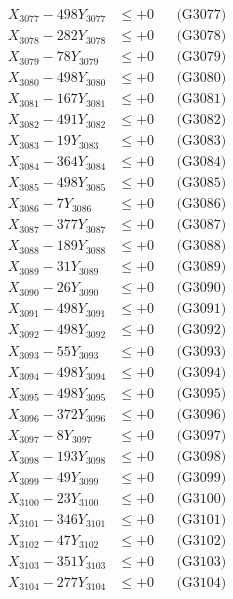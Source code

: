 \documentclass[a4paper,10pt]{article}
\begin{document}
{\begin{align}
X_{3077} - 498Y_{3077} &\leq +0 && \text{(G3077)} \\
X_{3078} - 282Y_{3078} &\leq +0 && \text{(G3078)} \\
X_{3079} - 78Y_{3079} &\leq +0 && \text{(G3079)} \\
X_{3080} - 498Y_{3080} &\leq +0 && \text{(G3080)} \\
\allowbreak
X_{3081} - 167Y_{3081} &\leq +0 && \text{(G3081)} \\
X_{3082} - 491Y_{3082} &\leq +0 && \text{(G3082)} \\
X_{3083} - 19Y_{3083} &\leq +0 && \text{(G3083)} \\
X_{3084} - 364Y_{3084} &\leq +0 && \text{(G3084)} \\
X_{3085} - 498Y_{3085} &\leq +0 && \text{(G3085)} \\
X_{3086} - 7Y_{3086} &\leq +0 && \text{(G3086)} \\
X_{3087} - 377Y_{3087} &\leq +0 && \text{(G3087)} \\
X_{3088} - 189Y_{3088} &\leq +0 && \text{(G3088)} \\
X_{3089} - 31Y_{3089} &\leq +0 && \text{(G3089)} \\
X_{3090} - 26Y_{3090} &\leq +0 && \text{(G3090)} \\
\allowbreak
X_{3091} - 498Y_{3091} &\leq +0 && \text{(G3091)} \\
X_{3092} - 498Y_{3092} &\leq +0 && \text{(G3092)} \\
X_{3093} - 55Y_{3093} &\leq +0 && \text{(G3093)} \\
X_{3094} - 498Y_{3094} &\leq +0 && \text{(G3094)} \\
X_{3095} - 498Y_{3095} &\leq +0 && \text{(G3095)} \\
X_{3096} - 372Y_{3096} &\leq +0 && \text{(G3096)} \\
X_{3097} - 8Y_{3097} &\leq +0 && \text{(G3097)} \\
X_{3098} - 193Y_{3098} &\leq +0 && \text{(G3098)} \\
X_{3099} - 49Y_{3099} &\leq +0 && \text{(G3099)} \\
X_{3100} - 23Y_{3100} &\leq +0 && \text{(G3100)} \\
\allowbreak
X_{3101} - 346Y_{3101} &\leq +0 && \text{(G3101)} \\
X_{3102} - 47Y_{3102} &\leq +0 && \text{(G3102)} \\
X_{3103} - 351Y_{3103} &\leq +0 && \text{(G3103)} \\
X_{3104} - 277Y_{3104} &\leq +0 && \text{(G3104)} \\

\end{align}}
\end{document}
